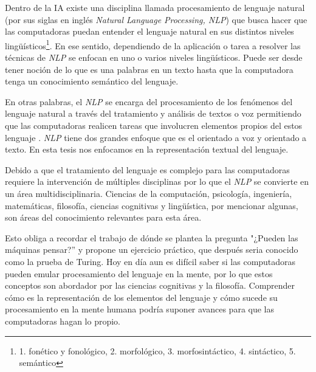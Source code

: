 \documentclass[letterpaper,12pt,oneside]{book}
\newcommand{\note}[4][]{\todo[author=#2,color=#3,size=\scriptsize,fancyline,caption={},#1]{#4}} %
\newcommand{\vic}[2][]{\note[#1]{Vic}{orange!40}{#2}}
\newcommand{\Vic}[2][]{\vic[inline,#1]{#2}\noindent}
\theoremstyle{definition}
\begin{document}
Dentro de la IA existe una disciplina llamada procesamiento de lenguaje natural (por sus siglas en inglés \textit{Natural Language Processing, NLP}) que busca hacer que las computadoras puedan entender el lenguaje natural en sus distintos niveles lingüísticos\footnote{1. fonético y fonológico, 2. morfológico, 3. morfosintáctico, 4. sintáctico, 5. semántico}\citep{victor2020pln}. En ese sentido, dependiendo de la aplicación o tarea a resolver las técnicas de \textit{NLP} se enfocan en uno o varios niveles lingüísticos. Puede ser desde tener noción de lo que es una palabras en un texto hasta que la computadora tenga un conocimiento semántico del lenguaje. %

En otras palabras, el \textit{NLP} se encarga del procesamiento de los fenómenos del lenguaje natural a través del tratamiento y análisis de textos o voz permitiendo que las computadoras realicen tareas que involucren elementos propios del estos lenguaje \citep{jurafsky2008speech}. \textit{NLP} tiene dos grandes enfoque que es el orientado a voz y orientado a texto. En esta tesis nos enfocamos en la representación textual del lenguaje.


Debido a que  el tratamiento del lenguaje es complejo para las computadoras requiere la intervención de múltiples disciplinas por lo que el \textit{NLP} se convierte en un área multidisciplinaria. Ciencias de la computación, psicología, ingeniería, matemáticas, filosofía, ciencias cognitivas y lingüística, por mencionar algunas, son áreas del conocimiento relevantes para esta área. 

Esto obliga a recordar el trabajo de \citet{turing1950computing} dónde se plantea la pregunta "¿Pueden las máquinas pensar?'' y propone un ejercicio práctico, que después seria conocido como la prueba de Turing. Hoy en día aun es difícil saber si las computadoras pueden emular procesamiento del lenguaje en la mente, por lo que estos conceptos son abordador por las ciencias cognitivas y la filosofía. Comprender cómo es la representación de los elementos del lenguaje y cómo sucede su procesamiento en la mente humana podría suponer avances para que las computadoras hagan lo propio. 

\end{document}
